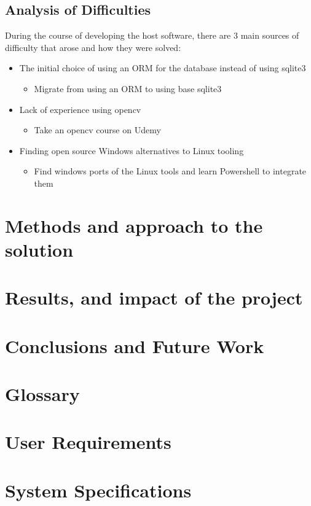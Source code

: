 \documentclass[12pt]{article}
\begin{document}
\subsection{Analysis of Difficulties}
During the course of developing the host software, there are 3 main sources of difficulty that arose and how they were solved:
\begin{itemize}
	\item The initial choice of using an ORM for the database instead of using sqlite3
	      \begin{itemize}
		      \item Migrate from using an ORM to using base sqlite3
	      \end{itemize}
	\item Lack of experience using opencv
	      \begin{itemize}
		      \item Take an opencv course on Udemy
	      \end{itemize}
	\item Finding open source Windows alternatives to Linux tooling
	      \begin{itemize}
		      \item Find windows ports of the Linux tools and learn Powershell to integrate them
	      \end{itemize}
\end{itemize}
\section{Methods and approach to the solution}
\section{Results, and impact of the project}
\section{Conclusions and Future Work}


\appendix
\section{Glossary}
\section{User Requirements}
\section{System Specifications}
\end{document}
